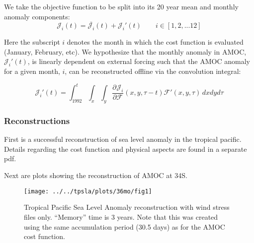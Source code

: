 \documentclass[a4paper,11pt]{article}
\newcommand{\pderiv}[3][]{%
  \ensuremath{\frac{\partial^{#1} {#2}}{\partial {#3}^{#1}}}}
\begin{document}
  We take the objective function to be split into its 20 year mean and monthly anomaly components: 
	\begin{equation}
	  \mathcal{J}_i(t) = \bar{\mathcal{J}_i}(t) + \mathcal{J}_i'(t) \qquad i \in [1, 2, ... 12]
	\end{equation}

  Here the subscript $i$ denotes the month in which the cost function is evaluated (January, February, etc). We hypothesize that the monthly anomaly in AMOC, $\mathcal{J}_i'(t)$, is linearly dependent on external forcing such that the AMOC anomaly for a given month, $i$, can be reconstructed offline via the convolution integral:
 
	\begin{equation}
	  \mathcal{J}_i'(t) = \int_{1992}^{t}\int_x \int_y\pderiv{\mathcal{J}_i}{\mathcal{F}}(x,y,\tau-t)\mathcal{F}'(x,y,\tau)\, dxdyd\tau  
	  \label{eq:reconstruct}
	\end{equation}

  \subsubsection{Reconstructions}

  First is a successful reconstruction of sea level anomaly in the tropical pacific. Details regarding the cost function and physical aspects are found in a separate pdf. 

  Next are plots showing the reconstruction of AMOC at 34S. 

   \begin{figure}
    \centering
    \texttt{[image: ../../tpsla/plots/36mo/fig1]}
    \caption{Tropical Pacific Sea Level Anomaly reconstruction with wind stress files only. ``Memory'' time is 3 years. Note that this was created using the same accumulation period (30.5 days) as for the AMOC cost function.}
    \label{fig:tpsla}
   \end{figure}

  

\end{document}
